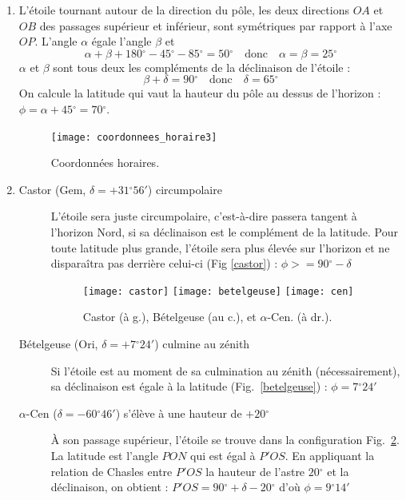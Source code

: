\documentclass[a4paper,10pt]{report}
\renewcommand{\deg}{\ensuremath{^{\circ}}}
\begin{document}
\begin{Answer}
  \begin{enumerate}
  \item L'étoile tournant autour de la direction du pôle, les deux
    directions $OA$ et $OB$ des passages supérieur et inférieur, sont
    symétriques par rapport à l'axe $OP$. L'angle $\alpha$ égale
    l'angle $\beta$ et
    $$
    \alpha + \beta+180\deg - 45\deg -85\deg = 50\deg
    \quad\text{donc}\quad
    \alpha=\beta=25\deg
    $$
    $\alpha$ et $\beta$ sont tous deux les compléments de la
    déclinaison de l'étoile :
    $$
    \beta+\delta = 90\deg
    \quad\text{donc}\quad
    \delta=65\deg
    $$
    On calcule la latitude qui vaut la hauteur du pôle au dessus de
    l'horizon : $\phi=\alpha+45\deg=70\deg$.

    \begin{figure}%
      \centering
      \texttt{[image: coordonnees\_horaire3]}
      \label{coordonneeshoraire3}
      \caption{Coordonnées horaires.}
    \end{figure}

  \item
    \begin{description}
    \item[Castor (Gem, $\delta = +31\deg56'$) circumpolaire]
      L'étoile sera juste circumpolaire, c'est-à-dire passera tangent
      à l'horizon Nord, si sa déclinaison est le complément de la
      latitude.  Pour toute latitude plus grande, l'étoile sera plus
      élevée sur l'horizon et ne disparaîtra pas derrière celui-ci
      (Fig \ref{castor}) : $\phi>=90\deg-\delta$
      \begin{figure}[htp]
        \centering
        \texttt{[image: castor]}
        \texttt{[image: betelgeuse]}
        \texttt{[image: cen]}
        \label{castor}
        \label{betelgeuse}
        \label{cen}
        \caption{Castor (à g.), Bételgeuse (au c.), et
          $\alpha$-Cen. (à dr.).}
      \end{figure}

    \item[Bételgeuse (Ori, $\delta = +7\deg24'$) culmine au zénith]
      Si l'étoile est au moment de sa culmination au zénith
      (nécessairement), sa déclinaison est égale à la latitude
      (Fig.~\ref{betelgeuse}) : $\phi=7\deg24'$

    \item[$\alpha$-Cen ($\delta = - 60\deg46'$) s'élève à une
      hauteur de $+20\deg$] À son passage supérieur, l'étoile se
      trouve dans la configuration Fig.~\ref{cen}.  La latitude est
      l'angle $PON$ qui est égal à $P'OS$. En appliquant la relation
      de Chasles entre $P'OS$ la hauteur de l'astre $20\deg$ et la
      déclinaison, on obtient : $P'OS=90\deg+\delta-20\deg$ d'où
      $\phi = 9\deg14'$
    \end{description}
  \end{enumerate}
\end{Answer}
\end{document}
